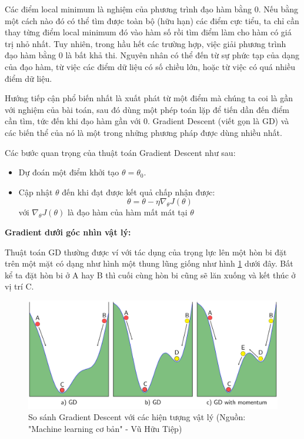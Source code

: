 Các điểm local minimum là nghiệm của phương trình đạo hàm bằng 0. Nếu bằng một cách nào đó có thể tìm được toàn bộ (hữu hạn) các điểm cực tiểu, ta chỉ cần thay từng điểm local minimum đó vào hàm số rồi tìm điểm làm cho hàm có giá trị nhỏ nhất. Tuy nhiên, trong hầu hết các trường hợp, việc giải phương trình đạo hàm bằng 0 là bất khả thi. Nguyên nhân có thể đến từ sự phức tạp của dạng của đạo hàm, từ việc các điểm dữ liệu có số chiều lớn, hoặc từ việc có quá nhiều điểm dữ liệu.

Hướng tiếp cận phổ biến nhất là xuất phát từ một điểm mà chúng ta coi là gần với nghiệm của bài toán, sau đó dùng một phép toán lặp để tiến dần đến điểm cần tìm, tức đến khi đạo hàm gần với 0. Gradient Descent (viết gọn là GD) và các biến thể của nó là một trong những phương pháp được dùng nhiều nhất.

Các bước quan trọng của thuật toán Gradient Descent như sau:
\begin{itemize}
\item Dự đoán một điểm khởi tạo $\theta = \theta_0$.
\item Cập nhật $\theta$ đến khi đạt được kết quả chấp nhận được: 
$$\theta = \theta - \eta \nabla_{\theta}J(\theta)$$
với $\nabla_{\theta}J(\theta)$ là đạo hàm của hàm mất mát tại $\theta$
\end{itemize}

\textbf{Gradient dưới góc nhìn vật lý:}

Thuật toán GD thường được ví với tác dụng của trọng lực lên một hòn bi đặt trên một mặt có dạng như hình một thung lũng giống như hình \ref{fig:gradient} dưới đây. Bất kể ta đặt hòn bi ở A hay B thì cuối cùng hòn bi cũng sẽ lăn xuống và kết thúc ở vị trí C.

\FloatBarrier
\begin{figure}[htp]
\begin{center}
\includegraphics[scale=0.06]{chap4/c4_figs/momentum.png}
\end{center}
\caption{So sánh Gradient Descent với các hiện tượng vật lý (Nguồn: "Machine learning cơ bản" - Vũ Hữu Tiệp)}
\label{fig:gradient}
\end{figure}
\FloatBarrier

